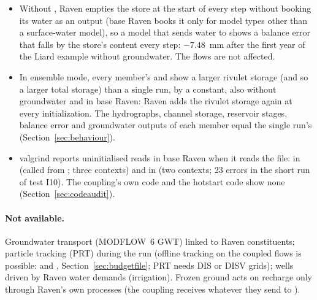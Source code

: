 \begin{itemize}
stays at that value afterwards: 0.431~mm in the Liard example with daily steps and 0.216~mm with half-day steps, in base
Raven~4.15 without groundwater and in a coupled run alike (Section~\ref{sec:accraven}).
\item Without , Raven empties the  store at the start of every step without booking
its water as an output (base Raven books it only for model types other than a surface-water model), so a model that sends
water to  shows a balance error that falls by the store's content every step: $-7.48$~mm after the first
year of the Liard example without groundwater. The flows are not affected.
\item In ensemble mode, every member's  and  show a larger rivulet storage
(and so a larger total storage) than a single run, by a constant, also without groundwater and in base Raven: Raven adds
the rivulet storage again at every initialization. The hydrographs, channel storage, reservoir stages, balance error and
groundwater outputs of each member equal the single run's (Section~\ref{sec:behaviour}).
\item valgrind reports uninitialised reads in base Raven when it reads the  file: in 
(called from ; three contexts) and in  (two
contexts; 23 errors in the short run of test I10). The coupling's own code and the hotstart code show none
(Section~\ref{sec:codeaudit}).
\end{itemize}
\paragraph{Not available.}
Groundwater transport (MODFLOW~6 GWT) linked to Raven constituents; particle tracking (PRT) during the run (offline tracking
on the coupled flows is possible:  and , Section~\ref{sec:budgetfile}; PRT
needs DIS or DISV grids); wells driven by Raven water demands (irrigation). Frozen ground acts on recharge only through Raven's own
processes (the coupling receives whatever they send to ).

